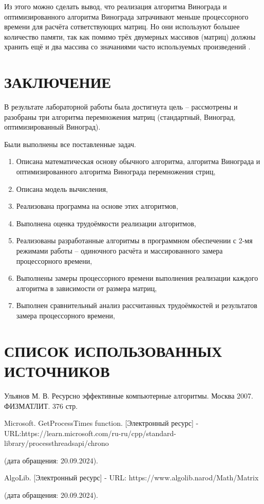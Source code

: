 \documentclass[14pt]{article}
\begin{document}
Из этого можно сделать вывод, что реализация алгоритма Винограда и оптимизированного алгоритма Винограда затрачивают меньше процессорного времени для расчёта сответствующих матриц. Но они используют большее количество памяти, так как помимо трёх двумерных массивов (матриц) должны хранить ещё и два массива со значаниями часто используемых произведений .\par

\newpage
\section*{ЗАКЛЮЧЕНИЕ}


В результате лабораторной работы была достигнута цель -- рассмотрены и разобраны три алгоритма перемножения матриц (стандартный, Виноград, оптимизированный Виноград).

Были выполнены все поставленные задач.
\begin{enumerate}
	\item Описана математическая основу обычного алгоритма, алгоритма Винограда и оптимизированного алгоритма Винограда перемножения стриц,
	\item Описана модель вычисления,
	\item Реализована программа на основе этих алгоритмов,
	\item Выполнена оценка трудоёмкости реализации алгоритмов,
	\item Реализованы разработанные алгоритмы в программном обеспечении с 2-мя режимами работы -- одиночного расчёта и массированного замера процессорного времени,
	\item Выполнены замеры процессорного времени выполнения реализации каждого алгоритма в зависимости от размера матриц,
	\item Выполнен сравнительный анализ рассчитанных трудоёмкостей и результатов замера процессорного времени,
\end{enumerate}

\newpage
\section*{СПИСОК ИСПОЛЬЗОВАННЫХ ИСТОЧНИКОВ}

\begin{list}{.}{ \leftmargin=0pt \rightmargin=0pt}
	\item \justifying Ульянов М. В. Ресурсно эффективные компьютерные алгоритмы. Москва 2007. ФИЗМАТЛИТ. 376 стр.\label{s:1}
	
	\item \justifying Microsoft. GetProcessTimes function. [Электронный ресурс] - URL:https://learn.microsoft.com/ru-ru/cpp/standard-library/processthreadsapi/chrono \par
	(дата обращения: 20.09.2024).\label{s:2}
	
	\item \justifying AlgoLib. [Электронный ресурс] - URL: https://www.algolib.narod/Math/Matrix \par
	(дата обращения: 20.09.2024).\label{s:3}
\end{list}
	
\end{document}
